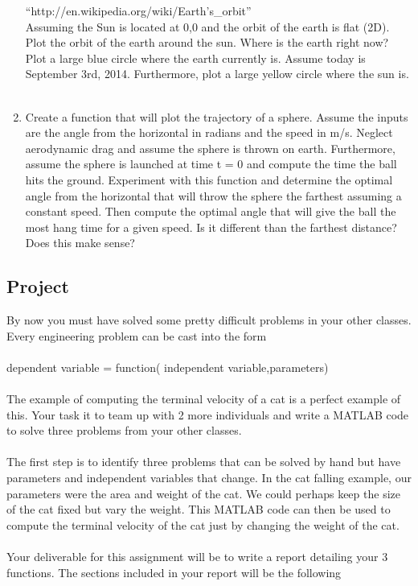 \begin{enumerate}
``http://en.wikipedia.org/wiki/Earth's\_orbit''
\ \\

Assuming the Sun is located at 0,0 and the orbit of the earth
is flat (2D). Plot the orbit of the earth around the sun. Where is the
earth right now? Plot a large blue circle where the earth currently
is. Assume today is September 3rd, 2014. Furthermore, plot a large
yellow circle where the sun is.
\ \\

\item Create a function that will plot the trajectory of a
sphere. Assume the inputs are the angle from the horizontal in radians
and the speed in m/s. Neglect aerodynamic drag and assume the sphere is thrown on
earth. Furthermore, assume the sphere is launched at time t = 0 and
compute the time the ball hits the ground. Experiment with this
function and determine the optimal angle from the horizontal that will
throw the sphere the farthest assuming a constant speed. Then compute
the optimal angle that will give the ball the most hang time for a
given speed. Is it different than the farthest distance? Does this
make sense?
\ \\

\end{enumerate}

\subsection{Project}

By now you must have solved some pretty difficult problems in your
other classes. Every engineering problem can be cast into the form  \\
\ \\
dependent variable = function( independent variable,parameters)\\
\ \\
The example of computing the terminal
velocity of a cat is a perfect example of this. Your task it to team
up with 2 more individuals and write a MATLAB code to solve three
problems from your other classes. \\
\ \\
The first step is to identify three problems that can be solved by
hand but have parameters and independent variables that change. In the
cat falling example, our parameters were the area and weight of the
cat. We could perhaps keep the size of the cat fixed but vary the
weight. This MATLAB code can then be used to compute the terminal
velocity of the cat just by changing the weight of the cat.  \\
\ \\
Your deliverable for this assignment will be to write a report
detailing your 3 functions. The sections included in your report will
be the following \\

